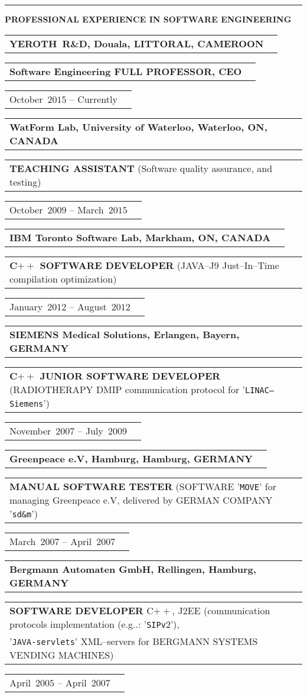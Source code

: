 \documentclass[9pt,a4paper]{article} %
\makeatletter
\newcommand{\headerrow}[2]
{\begin{tabular*}{\linewidth}{l@{\extracolsep{\fill}}r}
	#1 &
	#2 \\
\end{tabular*}}
\newcommand{\headerrowONE}[1]{\headerrow{#1}{}}
\newcommand{\jtwoee}{J$2$EE\xspace}
\newcommand{\cplusplus}{C$++$\xspace}
\newcommand{\cvitemdate}[2]{#1~$#2$\xspace}
\newcommand{\cvitempositionheld}[1]{\textbf{#1}\xspace}
\makeatother
\begin{document}
\vspace{1em}


\hrule
\begin{center}
{\large \textbf{PROFESSIONAL EXPERIENCE IN SOFTWARE ENGINEERING}}
\end{center}

\vspace{0.5em}

\headerrowONE{\textbf{YEROTH~R\&D, Douala, LITTORAL, CAMEROON}}
\headerrowONE{\cvitempositionheld{Software Engineering FULL PROFESSOR, CEO}}
\headerrowONE{\cvitemdate{October}{2015} -- Currently}	

\vspace{0.3em}

\headerrowONE{\textbf{WatForm Lab, University of Waterloo, Waterloo, ON, CANADA}}	
\headerrowONE{\cvitempositionheld{TEACHING ASSISTANT} (Software quality assurance, and testing)}
\headerrowONE{\cvitemdate{October}{2009} -- \cvitemdate{March}{2015}}
	
\vspace{0.3em}

\headerrowONE{\textbf{IBM Toronto Software Lab, Markham, ON, CANADA}}	
\headerrowONE{\cvitempositionheld{\cplusplus SOFTWARE DEVELOPER} (JAVA--J$9$ Just--In--Time compilation
optimization)}
\headerrowONE{\cvitemdate{January}{2012} -- \cvitemdate{August}{2012}}	

\vspace{0.3em}

\headerrowONE{\textbf{SIEMENS Medical Solutions, Erlangen, Bayern, GERMANY}}	
\headerrowONE{\cvitempositionheld{\cplusplus JUNIOR SOFTWARE DEVELOPER} (RADIOTHERAPY DMIP
communication protocol for '\texttt{LINAC--Siemens}')}
\headerrowONE{\cvitemdate{November}{2007} -- \cvitemdate{July}{2009}}	
	
\vspace{0.3em}

\headerrowONE{\textbf{Greenpeace e.V, Hamburg, Hamburg, GERMANY}}	
\headerrowONE{\cvitempositionheld{MANUAL SOFTWARE TESTER} 
(SOFTWARE '\texttt{MOVE}' for managing Greenpeace e.V, delivered by GERMAN COMPANY '\texttt{sd\&m}')}
\headerrowONE{\cvitemdate{March}{2007} -- \cvitemdate{April}{2007}}	

\vspace{0.3em}
\headerrowONE{\textbf{Bergmann Automaten GmbH, Rellingen, Hamburg, GERMANY}}	
\headerrowONE{\cvitempositionheld{SOFTWARE DEVELOPER} \cplusplus, \jtwoee 
(communication protocols implementation (e.g..: '\texttt{SIPv$2$}'), \\
'\texttt{JAVA-servlets}' XML--servers for BERGMANN SYSTEMS VENDING MACHINES)}
\headerrowONE{\cvitemdate{April}{2005} -- \cvitemdate{April}{2007}}	
	
\end{document}
